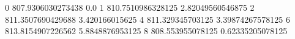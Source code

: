 0 807.9306030273438 0.0
1 810.7510986328125 2.82049560546875
2 811.3507690429688 3.420166015625
4 811.329345703125 3.39874267578125
6 813.8154907226562 5.8848876953125
8 808.553955078125 0.62335205078125
